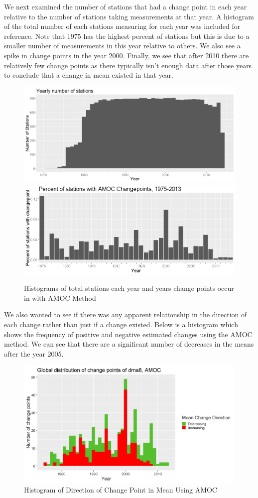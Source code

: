 \documentclass[11pt, oneside]{article}
\theoremstyle{definition}
\begin{document}
We next examined the number of stations that had a change point in each year relative to the number of stations taking measurements at that year. A histogram of the total number of each stations measuring for each year was included for reference. Note that 1975 has the highest percent of stations but this is due to a smaller number of measurements in this year relative to others. We also see a spike in change points in the year 2000. Finally, we see that after 2010 there are relatively few change points as there typically isn't enough data after those years to conclude that a change in mean existed in that year.

\begin{figure}[H] %
    \centering
    \includegraphics[width=0.7\linewidth]{plots/total_stations.png}
    \includegraphics[width=0.7\linewidth]{plots/amoc_hist_relative.png}
    \caption{Histograms of total stations each year and years change points occur in with AMOC Method}
    \label{amoc_hist_rel}
\end{figure}

We also wanted to see if there was any apparent relationship in the direction of each change rather than just if a change existed. Below is a histogram which shows the frequency of positive and negative estimated changes using the AMOC method. We can see that there are a significant number of decreases in the means after the year 2005.

\begin{figure}[H]
    \centering
    \includegraphics[width=0.8\linewidth]{plots/change_direction_AMOC.png}
    \caption{Histogram of Direction of Change Point in Mean Using AMOC}
    \label{amoc_hist_dir}
\end{figure}
\end{document}
